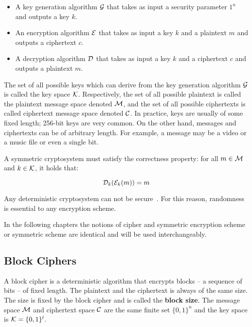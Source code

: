 \begin{itemize}
  \item A key generation algorithm $\mathcal{G}$ that takes as input a security parameter $1^{n}$ and outputs a key $k$.
  \item An encryption algorithm $\mathcal{E}$ that takes as input a key $k$ and a plaintext $m$ and outputs a ciphertext $c$.
  \item A decryption algorithm $\mathcal{D}$ that takes as input a key $k$ and a ciphertext $c$ and outputs a plaintext $m$.
\end{itemize}

The set of all possible keys which can derive from the key generation algorithm $\mathcal{G}$ is called the key space $\mathcal{K}$. Respectively, the set of all possible plaintext is called the plaintext message space denoted $\mathcal{M}$, and the set of all possible ciphertexts is called ciphertext message space denoted $\mathcal{C}$. In practice, keys are usually of some fixed length; 256-bit keys are very common. On the other hand, messages and ciphertexts can be of arbitrary length. For example, a message may be a video or a music file or even a single bit.

A symmetric cryptosystem must satisfy the correctness property: for all $m \in \mathcal{M}$ and $k \in \mathcal{K}$, it holds that:

\begin{equation*}
  \mathcal{D}_{k}(\mathcal{E}_{k}(m)) = m
\end{equation*}

Any deterministic cryptosystem can not be secure~\cite{Katz:2014:IMC:2700550, kiagias:crypto}. For this reason, randomness is essential to any encryption scheme.

In the following chapters the notions of cipher and symmetric encryption scheme or symmetric scheme are identical and will be used interchangeably.

\subsection{Block Ciphers}
\label{preliminaries:sym:block}

A block cipher is a deterministic algorithm that encrypts blocks -- a sequence of bits -- of fixed length. The plaintext and the ciphertext is always of the same size. The size is fixed by the block cipher and is called the \textbf{block size}. The message space $\mathcal{M}$ and ciphertext space $\mathcal{C}$ are the same finite set $\{ 0, 1\}^{n}$ and the key space is  $\mathcal{K} = \{ 0, 1\}^{l}$.


